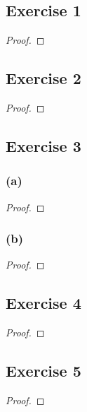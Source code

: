 \documentclass[14pt]{extarticle}
\begin{document}
\subsection{Exercise 1}

\begin{proof}

\end{proof}

\subsection{Exercise 2}

\begin{proof}

\end{proof}

\subsection{Exercise 3}

\subsubsection{(a)}

\begin{proof}

\end{proof}

\subsubsection{(b)}

\begin{proof}

\end{proof}

\subsection{Exercise 4}

\begin{proof}

\end{proof}

\subsection{Exercise 5}

\begin{proof}

\end{proof}
\end{document}
